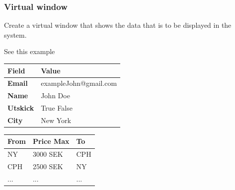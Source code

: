\subsubsection{Virtual window}
Create a virtual window that shows the data that is to be displayed in the system. 

See this example 

\begin{longtable}{|p{3cm}|p{9cm}|}
    \hline
    \rowcolor{headergray}
    \textbf{Field} & \textbf{Value} \\ \hline
    \textbf{Email} & exampleJohn@gmail.com \\ \hline
    \textbf{Name} & John Doe \\ \hline
    \textbf{Utskick} & True \hspace{1em} False \\ \hline
    \textbf{City} & New York \\ \hline
\end{longtable}

\vspace{1cm} %

\begin{longtable}{|p{3cm}|p{3cm}|p{3cm}|}
    \hline
    \rowcolor{headergray}
    \textbf{From} & \textbf{Price Max} & \textbf{To} \\ \hline
    NY & 3000 SEK & CPH \\ \hline
    CPH & 2500 SEK & NY \\ \hline
    ... & ... & ... \\ \hline
\end{longtable}